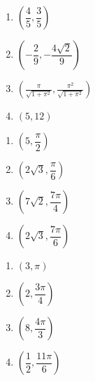 \begin{multicols}{4} 

\begin{enumerate}

\setcounter{enumi}{\value{HW}}

\item $\left( \dfrac{4}{5}, \dfrac{3}{5} \right)$ 
\item $\left( -\dfrac{2}{9},  -\dfrac{4\sqrt{2}}{9} \right)$
\item $\left( \frac{\pi}{\sqrt{1+\pi^2}}, \frac{\pi^2}{\sqrt{1+\pi^2}} \right)$ 
\item $\left( 5, 12 \right)$ 

\setcounter{HW}{\value{enumi}}

\end{enumerate}

\end{multicols}

\begin{multicols}{4}

\begin{enumerate}

\setcounter{enumi}{\value{HW}}

\item $\left( 5, \dfrac{\pi}{2} \right)$ 
\item $\left( 2\sqrt{3}, \dfrac{\pi}{6} \right)$ 
\item $\left( 7\sqrt{2}, \dfrac{7\pi}{4} \right)$
\item $\left( 2\sqrt{3}, \dfrac{7\pi}{6} \right)$

\setcounter{HW}{\value{enumi}}

\end{enumerate}

\end{multicols}

\begin{multicols}{4}

\begin{enumerate}

\setcounter{enumi}{\value{HW}}

\item $\left( 3, \pi \right)$ 
\item $\left( 2, \dfrac{3\pi}{4} \right)$
\item $\left( 8, \dfrac{4\pi}{3} \right)$
\item $\left( \dfrac{1}{2}, \dfrac{11\pi}{6} \right)$

\setcounter{HW}{\value{enumi}}

\end{enumerate}

\end{multicols}

